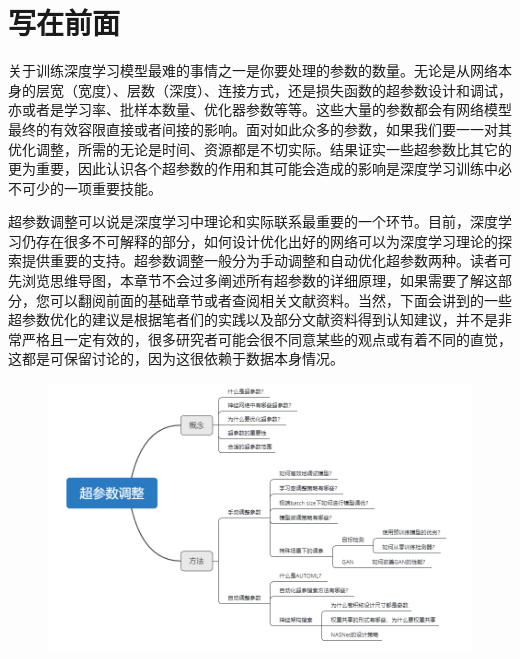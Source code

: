 

\chapter{ 写在前面}\label{ux5199ux5728ux524dux9762}

​
关于训练深度学习模型最难的事情之一是你要处理的参数的数量。无论是从网络本身的层宽（宽度）、层数（深度）、连接方式，还是损失函数的超参数设计和调试，亦或者是学习率、批样本数量、优化器参数等等。这些大量的参数都会有网络模型最终的有效容限直接或者间接的影响。面对如此众多的参数，如果我们要一一对其优化调整，所需的无论是时间、资源都是不切实际。结果证实一些超参数比其它的更为重要，因此认识各个超参数的作用和其可能会造成的影响是深度学习训练中必不可少的一项重要技能。

​
超参数调整可以说是深度学习中理论和实际联系最重要的一个环节。目前，深度学习仍存在很多不可解释的部分，如何设计优化出好的网络可以为深度学习理论的探索提供重要的支持。超参数调整一般分为手动调整和自动优化超参数两种。读者可先浏览思维导图，本章节不会过多阐述所有超参数的详细原理，如果需要了解这部分，您可以翻阅前面的基础章节或者查阅相关文献资料。当然，下面会讲到的一些超参数优化的建议是根据笔者们的实践以及部分文献资料得到认知建议，并不是非常严格且一定有效的，很多研究者可能会很不同意某些的观点或有着不同的直觉，这都是可保留讨论的，因为这很依赖于数据本身情况。

\begin{figure}
\centering
\includegraphics{./img/ch14/思维导图.png}
\caption{}
\end{figure}

